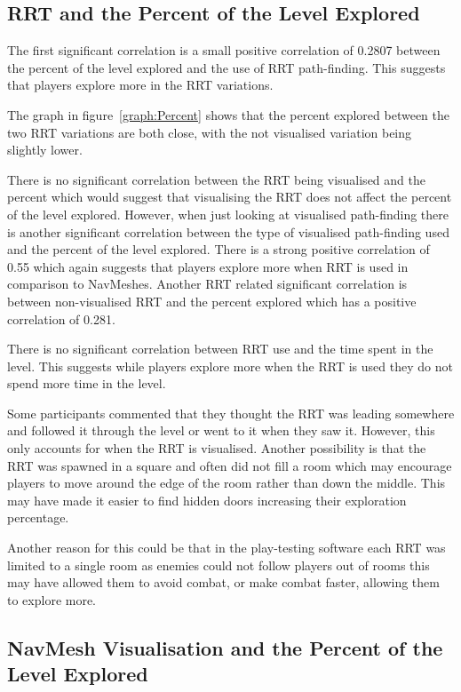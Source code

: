 \documentclass[journal]{IEEEtran}
\begin{document}
	
	
	\subsection{RRT and the Percent of the Level Explored} \label{RRTExplore}
	The first significant correlation is a small positive correlation of 0.2807 between the percent of the level explored and the use of RRT path-finding. This suggests that players explore more in the RRT variations.        
	
	The graph in figure~\ref{graph:Percent} shows that the percent explored between the two RRT variations are both close, with the not visualised variation being slightly lower. 
	
	There is no significant correlation between the RRT being visualised and the percent which would suggest that visualising the RRT does not affect the percent of the level explored. However, when just looking at visualised path-finding there is another significant correlation between the type of visualised path-finding used and the percent of the level explored. There is a strong positive correlation of 0.55 which again suggests that players explore more when RRT is used in comparison to NavMeshes. Another RRT related significant correlation is between non-visualised RRT and the percent explored which has a positive correlation of 0.281.  
	
	There is no significant correlation between RRT use and the time spent in the level. This suggests while players explore more when the RRT is used they do not spend more time in the level.  
	
	Some participants commented that they thought the RRT was leading somewhere and followed it through the level or went to it when they saw it.  However, this only accounts for when the RRT is visualised. Another possibility is that the RRT was spawned in a square and often did not fill a room which may encourage players to move around the edge of the room rather than down the middle. This may have made it easier to find hidden doors increasing their exploration percentage.
	
	Another reason for this could be that in the play-testing software each RRT was limited to a single room as enemies could not follow players out of rooms this may have allowed them to avoid combat, or make combat faster, allowing them to explore more. 
	
	
	\subsection{NavMesh Visualisation and the Percent of the Level Explored}
	
\end{document}
